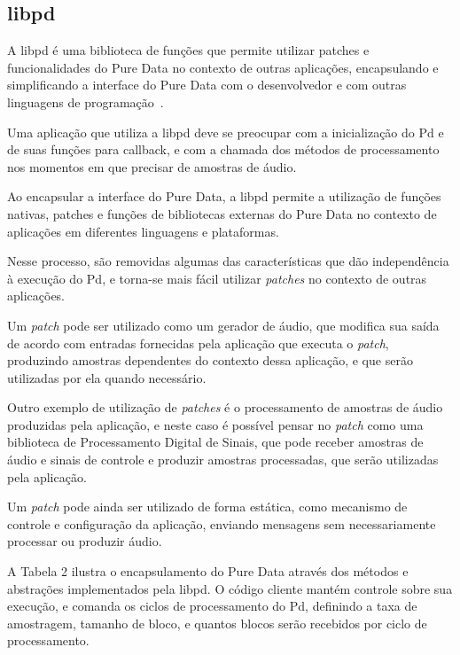 \documentclass[a4paper, 11pt, twoside]{article}
\begin{document}
\begin{multicols}{2}
\subsection{libpd}

A libpd é uma biblioteca de funções que permite utilizar patches e 
funcionalidades do Pure Data no contexto de outras aplicações,
encapsulando e simplificando a interface do Pure Data com o
desenvolvedor e com outras linguagens de programação~\cite{libpd1}.

Uma aplicação que utiliza a libpd deve se preocupar com a inicialização do Pd
e de suas funções para callback, e com a chamada dos métodos 
de processamento nos momentos em que precisar de amostras de áudio.

Ao encapsular a interface do Pure Data, a libpd
permite a utilização de funções nativas, patches e funções de 
bibliotecas externas do Pure Data no contexto de aplicações em 
diferentes linguagens e plataformas.

Nesse processo, são removidas algumas das características
que dão independência à execução do Pd, e torna-se 
mais fácil utilizar \textit{patches} no contexto de outras aplicações.

Um \textit{patch} pode ser utilizado como um gerador de áudio,
que modifica sua saída de acordo com entradas fornecidas pela
aplicação que executa o \textit{patch}, produzindo amostras 
dependentes do contexto dessa aplicação, e que serão utilizadas 
por ela quando necessário.

Outro exemplo de utilização de \textit{patches} é o processamento de
amostras de áudio produzidas pela aplicação, e neste caso é possível
pensar no \textit{patch} como uma biblioteca de Processamento Digital
de Sinais, que pode receber amostras de áudio e sinais de controle e produzir
amostras processadas, que serão utilizadas pela aplicação.

Um \textit{patch} pode ainda ser utilizado de forma estática, como 
mecanismo de controle e configuração da aplicação, enviando mensagens
sem necessariamente processar ou produzir áudio.

A Tabela 2 ilustra o encapsulamento do Pure Data através dos
métodos e abstrações implementados pela libpd. O código cliente
mantém controle sobre sua execução, e comanda os ciclos de 
processamento do Pd, definindo a taxa de amostragem, tamanho
de bloco, e quantos blocos serão recebidos por ciclo de processamento.


\end{multicols}
\end{document}
